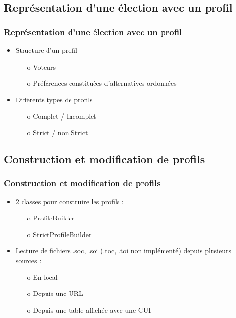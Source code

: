 \documentclass[english, french]{beamer}
\begin{document}
	\subsection{Représentation d'une élection avec un profil}
	    \begin{frame}
        	\frametitle{Représentation d'une élection avec un profil}
        	\begin{itemize}
        	    \item Structure d'un profil
        	    \begin{itemize}
        	        \item[o] Voteurs
        	        \item[o] Préférences constituées d’alternatives ordonnées
        	    \end{itemize}
        	    \item Différents types de profils
        	    \begin{itemize}
        	        \item[o] Complet / Incomplet
        	        \item[o] Strict / non Strict
        	    \end{itemize}
        	\end{itemize}
        \end{frame}
    \subsection{Construction et modification de profils}
	    \begin{frame}
        	\frametitle{Construction et modification de profils}
        	    \begin{itemize}
        	        \item 2 classes pour construire les profils :
        	        \begin{itemize}
        	            \item[o] ProfileBuilder
        	            \item[o] StrictProfileBuilder
        	        \end{itemize}
        	        \item Lecture de fichiers .soc, .soi (.toc, .toi non implémenté) depuis plusieurs sources :
        	       \begin{itemize}
        	           \item[o] En local
        	           \item[o] Depuis une URL
        	           \item[o] Depuis une table affichée avec une GUI
        	       \end{itemize}
        	    \end{itemize}
        \end{frame}
\end{document}
